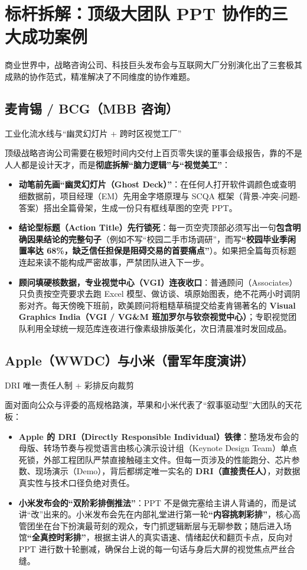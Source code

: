 \documentclass[UTF8,a4paper,11pt,fontset=none]{ctexart}
\newcommand{\tagline}[1]{{\sffamily\small\color{muted}#1\par}\vspace{0.18em}}
\newcommand{\secstart}[1]{\needspace{5.2\baselineskip}\section{#1}}
\newcommand{\substart}[1]{\needspace{4.2\baselineskip}\subsection{#1}}
\newcommand{\badeg}[1]{{\color{muted}#1}}
\newcommand{\goodeg}[1]{{\color{primary}\bfseries #1}}
\begin{document}
\secstart{标杆拆解：顶级大团队 PPT 协作的三大成功案例}

商业世界中，战略咨询公司、科技巨头发布会与互联网大厂分别演化出了三套极其成熟的协作范式，精准解决了不同维度的协作难题。

\substart{麦肯锡 / BCG（MBB 咨询）}
\tagline{工业化流水线与“幽灵幻灯片 + 跨时区视觉工厂”}

顶级战略咨询公司需要在极短时间内交付上百页零失误的董事会级报告，靠的不是人人都是设计天才，而是\textbf{彻底拆解“脑力逻辑”与“视觉美工”}：

\begin{itemize}
\item \textbf{动笔前先画“幽灵幻灯片（Ghost Deck）”}：在任何人打开软件调颜色或查明细数据前，项目经理（EM）先用金字塔原理与 SCQA 框架（背景-冲突-问题-答案）搭出全篇骨架，生成一份只有框线草图的空壳 PPT。
\item \textbf{结论型标题（Action Title）先行锁死}：每一页空壳顶部必须写出一句\textbf{包含明确因果结论的完整句子}（例如不写\badeg{“校园二手市场调研”}，而写\goodeg{“校园毕业季闲置率达 68\%，缺乏信任担保是阻碍交易的首要痛点”}）。如果把全篇每页标题连起来读不能构成严密故事，严禁团队进入下一步。
\item \textbf{顾问填硬核数据，专业视觉中心（VGI）连夜收口}：普通顾问（Associates）只负责按空壳要求去跑 Excel 模型、做访谈、填原始图表，绝不花两小时调阴影对齐。每天傍晚下班前，欧美顾问将粗糙草稿提交给麦肯锡著名的 \textbf{Visual Graphics India（VGI / VG\&M 班加罗尔与钦奈视觉中心）}；专职视觉团队利用全球统一规范库连夜进行像素级排版美化，次日清晨准时发回成品。
\end{itemize}

\substart{Apple（WWDC）与小米（雷军年度演讲）}
\tagline{DRI 唯一责任人制 + 彩排反向裁剪}

面对面向公众与评委的高规格路演，苹果和小米代表了“叙事驱动型”大团队的天花板：

\begin{itemize}
\item \textbf{Apple 的 DRI（Directly Responsible Individual）铁律}：整场发布会的母版、转场节奏与视觉语言由核心演示设计组（Keynote Design Team）单点死锁，外部工程团队严禁直接触碰主文件。但每一页涉及的性能跑分、芯片参数、现场演示（Demo），背后都绑定唯一实名的 \textbf{DRI（直接责任人）}，对数据真实性与技术口径负绝对责任。
\item \textbf{小米发布会的“双阶彩排倒推法”}：PPT 不是做完塞给主讲人背诵的，而是试讲“改”出来的。小米发布会先在内部礼堂进行第一轮\textbf{“内容挑刺彩排”}，核心高管团坐在台下扮演最苛刻的观众，专门抓逻辑断层与无聊参数；随后进入场馆\textbf{“全真控时彩排”}，根据主讲人的真实语速、情绪起伏和翻页卡点，反向对 PPT 进行数十轮删减，确保台上说的每一句话与身后大屏的视觉焦点严丝合缝。
\end{itemize}
\end{document}
